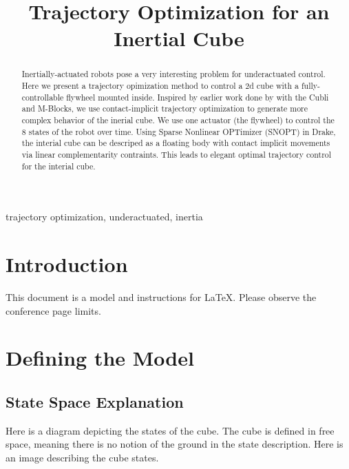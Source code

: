 \documentclass[conference]{IEEEtran}
\begin{document}
\title{Trajectory Optimization for an Inertial Cube \\
}

\author{
}

\maketitle

\begin{abstract}
Inertially-actuated robots pose a very interesting problem for underactuated control. Here we present a trajectory opimization method to control a 2d cube with a fully-controllable flywheel mounted inside. Inspired by earlier work done by with the Cubli and M-Blocks, we use contact-implicit trajectory optimization to generate more complex behavior of the inerial cube. We use one actuator (the flywheel) to control the 8 states of the robot over time. Using Sparse Nonlinear OPTimizer (SNOPT) in Drake, the interial cube can be descriped as a floating body with contact implicit movements via linear complementarity contraints. This leads to elegant optimal trajectory control for the interial cube.
\end{abstract}

\begin{IEEEkeywords}
trajectory optimization, underactuated, inertia
\end{IEEEkeywords}

\section{Introduction}
This document is a model and instructions for \LaTeX.
Please observe the conference page limits.

\section{Defining the Model}

\subsection{State Space Explanation}

Here is a diagram depicting the states of the cube. The cube is defined in free space, meaning there is no notion of the ground in the state description. Here is an image describing the cube states.
\end{document}
